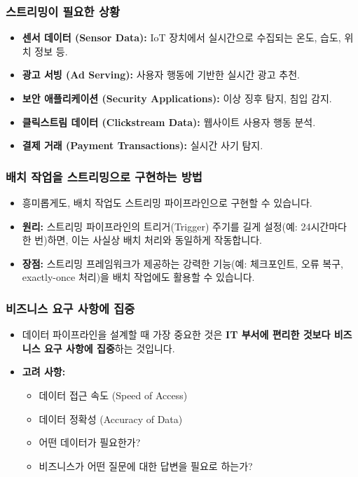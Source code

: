 \documentclass[11pt,a4paper]{article}
\theoremstyle{definition}
\begin{document}
\subsubsection{스트리밍이 필요한 상황}
\begin{itemize}
    \item \textbf{센서 데이터 (Sensor Data):} IoT 장치에서 실시간으로 수집되는 온도, 습도, 위치 정보 등.
    \item \textbf{광고 서빙 (Ad Serving):} 사용자 행동에 기반한 실시간 광고 추천.
    \item \textbf{보안 애플리케이션 (Security Applications):} 이상 징후 탐지, 침입 감지.
    \item \textbf{클릭스트림 데이터 (Clickstream Data):} 웹사이트 사용자 행동 분석.
    \item \textbf{결제 거래 (Payment Transactions):} 실시간 사기 탐지.
\end{itemize}

\subsubsection{배치 작업을 스트리밍으로 구현하는 방법}
\begin{itemize}
    \item 흥미롭게도, 배치 작업도 스트리밍 파이프라인으로 구현할 수 있습니다.
    \item \textbf{원리:} 스트리밍 파이프라인의 트리거(Trigger) 주기를 길게 설정(예: 24시간마다 한 번)하면, 이는 사실상 배치 처리와 동일하게 작동합니다.
    \item \textbf{장점:} 스트리밍 프레임워크가 제공하는 강력한 기능(예: 체크포인트, 오류 복구, exactly-once 처리)을 배치 작업에도 활용할 수 있습니다.
\end{itemize}

\subsubsection{비즈니스 요구 사항에 집중}
\begin{itemize}
    \item 데이터 파이프라인을 설계할 때 가장 중요한 것은 \textbf{IT 부서에 편리한 것보다 비즈니스 요구 사항에 집중}하는 것입니다.
    \item \textbf{고려 사항:}
    \begin{itemize}
        \item 데이터 접근 속도 (Speed of Access)
        \item 데이터 정확성 (Accuracy of Data)
        \item 어떤 데이터가 필요한가?
        \item 비즈니스가 어떤 질문에 대한 답변을 필요로 하는가?
    \end{itemize}
\end{itemize}
\end{document}
